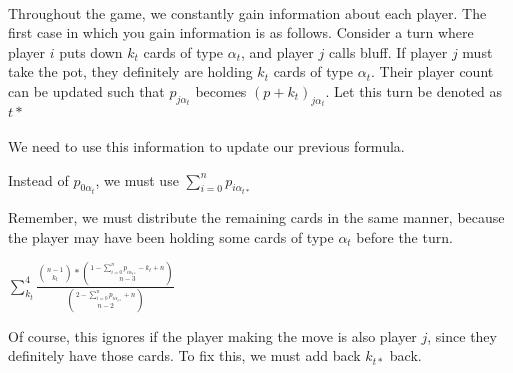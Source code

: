 \documentclass[letterpaper,11pt]{report}
\begin{document}
\paragraph*{} Throughout the game, we constantly gain information about each player. The first case in which you gain information is as follows. Consider a turn where player $i$ puts down $k_t$ cards of type $\alpha_t$, and player $j$ calls bluff. If player $j$ must take the pot, they definitely are holding $k_t$ cards of type $\alpha_t$. Their player count can be updated such that $p_{j \alpha_t}$ becomes $(p+k_t)_{j \alpha_t}$. Let this turn be denoted as $t*$
\paragraph{} We need to use this information to update our previous formula.
\begin{description}
    \item Instead of $p_{0 \alpha_{t}}$, we must use $\sum\limits_{i=0}^{n}p_{i \alpha_{t*}}$
    \item Remember, we must distribute the remaining cards in the same manner, because the player may have been holding some cards of type $\alpha_t$ before the turn.
    \item $\sum\limits_{k_t}^{4} \frac{{n-1 \choose k_t}\ast{1-\sum\limits_{i=0}^{n}p_{i \alpha_{t*}} - k_t + n \choose n-3}}{{2-\sum\limits_{i=0}^{n}p_{i \alpha_{t*}} + n \choose n-2}}$
    \item Of course, this ignores if the player making the move is also player $j$, since they definitely have those cards. To fix this, we must add back $k_{t*}$ back. 
\end{description}
\end{document}
